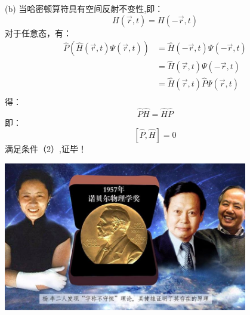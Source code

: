 \begin{frame} 
    (b) 当哈密顿算符具有空间反射不变性,即：
    $$ H(\vec{r},t)= H(-\vec{r},t)$$
    对于任意态，有：
    $$\begin{aligned}
        \hat{P} (\hat{H}(\vec{r},t) \Psi (\vec{r},t)) &= \hat{H}(-\vec{r},t) \Psi (-\vec{r},t)\\
        &= \hat{H}(\vec{r},t) \Psi (-\vec{r},t)\\
        &= \hat{H}(\vec{r},t) \hat{P} \Psi (\vec{r},t)\\
    \end{aligned}$$
    得： $$ \hat{P} \hat{H} = \hat{H} \hat{P} $$
    即：$$[\hat{P}, \hat{H}]=0$$
    满足条件（2）,证毕！
\end{frame}

\begin{frame}
    \centering
    \includegraphics[width=0.8\textwidth]{figs/2021-12-18-00-23-17.png} \\
\end{frame} 





